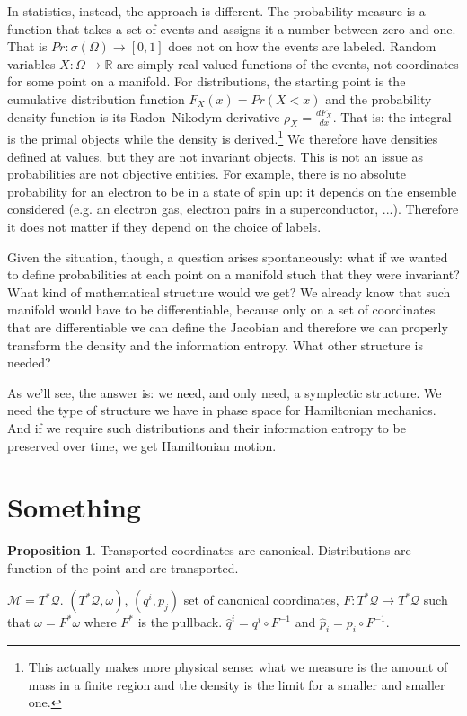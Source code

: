 \documentclass[smallextended]{svjour3}
\numberwithin{equation}{section}
\theoremstyle{definition}
\newtheorem{prop}[equation]{Proposition}
\begin{document}
In statistics, instead, the approach is different. The probability measure is a function that takes a set of events and assigns it a number between zero and one. That is $Pr : \sigma(\Omega) \rightarrow [0,1]$ does not on how the events are labeled. Random variables $X : \Omega \rightarrow \mathbb{R}$ are simply real valued functions of the events, not coordinates for some point on a manifold. For distributions, the starting point is the cumulative distribution function $F_X(x)=Pr(X<x)$ and the probability density function is its Radon–Nikodym derivative $\rho_X = \frac{dF_X}{dx}$. That is: the integral is the primal objects while the density is derived.\footnote{This actually makes more physical sense: what we measure is the amount of mass in a finite region and the density is the limit for a smaller and smaller one.} We therefore have densities defined at values, but they are not invariant objects. This is not an issue as probabilities are not objective entities. For example, there is no absolute probability for an electron to be in a state of spin up: it depends on the ensemble considered (e.g. an electron gas, electron pairs in a superconductor, ...). Therefore it does not matter if they depend on the choice of labels.

Given the situation, though, a question arises spontaneously: what if we wanted to define probabilities at each point on a manifold stuch that they were invariant? What kind of mathematical structure would we get? We already know that such manifold would have to be differentiable, because only on a set of coordinates that are differentiable we can define the Jacobian and therefore we can properly transform the density and the information entropy. What other structure is needed?

As we'll see, the answer is: we need, and only need, a symplectic structure. We need the type of structure we have in phase space for Hamiltonian mechanics. And if we require such distributions and their information entropy to be preserved over time, we get Hamiltonian motion.

\section{Something}

\begin{prop}
	Transported coordinates are canonical. Distributions are function of the point and are transported.
\end{prop}

$\mathcal{M} = T^*\mathcal{Q}$. $(T^*\mathcal{Q}, \omega)$, $(q^i, p_j)$ set of canonical coordinates, $F: T^*\mathcal{Q} \rightarrow T^*\mathcal{Q}$ such that $\omega = F^* \omega$ where $F^*$ is the pullback. $\hat{q}^i = q^i \circ F^{-1}$ and $\hat{p}_i = p_i \circ F^{-1}$.
\end{document}
